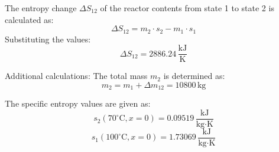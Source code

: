 The entropy change \( \Delta S_{12} \) of the reactor contents from state 1 to state 2 is calculated as:  
\[
\Delta S_{12} = m_2 \cdot s_2 - m_1 \cdot s_1
\]  
Substituting the values:  
\[
\Delta S_{12} = 2886.24 \, \frac{\text{kJ}}{\text{K}}
\]  

Additional calculations:  
The total mass \( m_2 \) is determined as:  
\[
m_2 = m_1 + \Delta m_{12} = 10800 \, \text{kg}
\]  

The specific entropy values are given as:  
\[
s_2(70^\circ\text{C}, x=0) = 0.09519 \, \frac{\text{kJ}}{\text{kg·K}}
\]  
\[
s_1(100^\circ\text{C}, x=0) = 1.73069 \, \frac{\text{kJ}}{\text{kg·K}}
\]